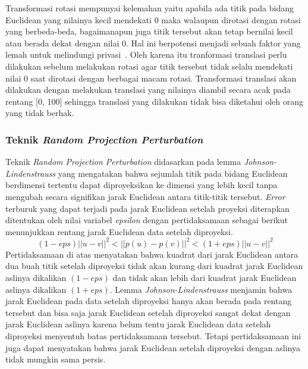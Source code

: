 Transformasi rotasi mempunyai kelemahan yaitu apabila ada titik pada bidang Euclidean yang nilainya kecil mendekati 0 maka walaupun dirotasi dengan rotasi yang berbeda-beda, bagaimanapun juga titik tersebut akan tetap bernilai kecil atau berada dekat dengan nilai 0. Hal ini berpotensi menjadi sebuah faktor yang lemah untuk melindungi privasi~\cite{rotation:05:chenliu}. Oleh karena itu tranformasi translasi perlu dilakukan sebelum melakukan rotasi agar titik tersebut tidak selalu mendekati nilai 0 saat dirotasi dengan berbagai macam rotasi. Transformasi translasi akan dilakukan dengan melakukan translasi yang nilainya diambil secara acak pada rentang [0, 100] sehingga translasi yang dilakukan tidak bisa diketahui oleh orang yang tidak berhak.

\subsubsection{Teknik \textit{Random Projection Perturbation}}
\label{subsubsec:analisis-projection}

Teknik \textit{Random Projection Perturbation} didasarkan pada lemma \textit{Johnson-Lindenstrauss} yang mengatakan bahwa sejumlah titik pada bidang Euclidean berdimensi tertentu dapat diproyeksikan ke dimensi yang lebih kecil tanpa mengubah secara signifikan jarak Euclidean antara titik-titik tersebut. \textit{Error} terburuk yang dapat terjadi pada jarak Euclidean setelah proyeksi diterapkan ditentukan oleh nilai variabel \textit{epsilon} dengan pertidaksamaan sebagai berikut menunjukkan rentang jarak Euclidean data setelah diproyeksi.
\begin{equation}
	(1-eps)||u - v||^{2}<||p(u) - p(v)||^{2}<(1+eps)||u - v||^{2}
\end{equation}
Pertidaksamaan di atas menyatakan bahwa kuadrat dari jarak Euclidean antara dua buah titik setelah diproyeksi tidak akan kurang dari kuadrat jarak Euclidean aslinya dikalikan \((1-eps)\) dan tidak akan lebih dari kuadrat jarak Euclidean aslinya dikalikan \((1+eps)\). Lemma \textit{Johnson-Lindenstrauss} menjamin bahwa jarak Euclidean pada data setelah diproyeksi hanya akan berada pada rentang tersebut dan bisa saja jarak Euclidean setelah diproyeksi sangat dekat dengan jarak Euclidean aslinya karena belum tentu jarak Euclidean data setelah diproyeksi menyentuh batas pertidaksamaan tersebut. Tetapi pertidaksamaan ini juga dapat menyatakan bahwa jarak Euclidean setelah diproyeksi dengan aslinya tidak mungkin sama persis.


